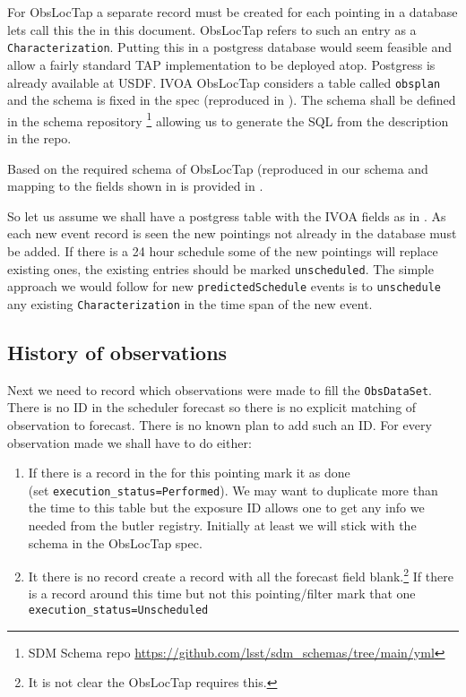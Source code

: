 For ObsLocTap a separate record must be created for each pointing in a database lets call this the \DB in this document.
ObsLocTap refers to such an entry as a \texttt{ Characterization}.
Putting this in a postgress database would seem feasible and allow a fairly standard TAP implementation to be deployed atop.
Postgress is already available at USDF.
IVOA ObsLocTap considers a table called \texttt{obsplan} and the schema is fixed in the spec (reproduced in ).
The schema shall be  defined in the schema repository
\footnote{ SDM Schema repo \url{https://github.com/lsst/sdm_schemas/tree/main/yml}}
 allowing us to generate the SQL from the description in the repo.

Based on the required schema of ObsLocTap (reproduced in  our schema and mapping to the fields shown in  is provided in .




So let us assume we shall have a postgress table with the IVOA fields as in .
As each new event record is seen the new pointings not already in the database must be added.
If there is a 24 hour schedule some of the new pointings will replace existing ones, the existing entries should be marked \texttt{unscheduled}.
The simple approach we would follow  for new \texttt{predictedSchedule} events is to \texttt {unschedule} any existing \texttt {Characterization} in the time span of the new event.

\subsection{History of observations}
Next we need to record which observations were made to fill the \texttt{ObsDataSet}.
There is no ID in the scheduler forecast so there is no explicit matching of observation to forecast.
There is no known plan to add such an ID.
For every observation made we shall have to do either:
\begin{enumerate}
\item If there is a record in the \DB for this pointing mark it as done\\ (set \texttt{execution\_status=Performed}).  We may want to duplicate more than the time to this table but the exposure ID allows one to get any info we needed from the butler registry.
Initially at least we will stick with the schema in the ObsLocTap spec.
\item It there is no record create a record with  all the forecast field blank.\footnote{It is not clear the ObsLocTap requires this.} If there is a record around this time but not this pointing/filter mark that one  \texttt{execution\_status=Unscheduled}
\end{enumerate}

